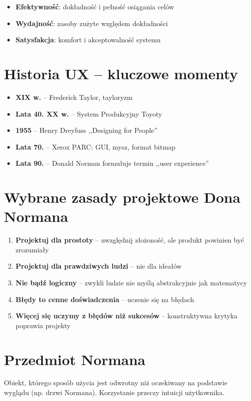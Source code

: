 \begin{itemize}
    \item \textbf{Efektywność}: dokładność i pełność osiągania celów
    \item \textbf{Wydajność}: zasoby zużyte względem dokładności
    \item \textbf{Satysfakcja}: komfort i akceptowalność systemu
\end{itemize}

\section{Historia UX -- kluczowe momenty}

\begin{itemize}
    \item \textbf{XIX w.} -- Frederick Taylor, tayloryzm
    \item \textbf{Lata 40. XX w.} -- System Produkcyjny Toyoty
    \item \textbf{1955} -- Henry Dreyfuss ,,Designing for People''
    \item \textbf{Lata 70.} -- Xerox PARC: GUI, mysz, format bitmap
    \item \textbf{Lata 90.} -- Donald Norman formułuje termin ,,user experience''
\end{itemize}

\section{Wybrane zasady projektowe Dona Normana}

\begin{enumerate}
    \item \textbf{Projektuj dla prostoty} -- uwzględnij złożoność, ale produkt powinien być zrozumiały
    \item \textbf{Projektuj dla prawdziwych ludzi} -- nie dla ideałów
    \item \textbf{Nie bądź logiczny} -- zwykli ludzie nie myślą abstrakcyjnie jak matematycy
    \item \textbf{Błędy to cenne doświadczenia} -- uczenie się na błędach
    \item \textbf{Więcej się uczymy z błędów niż sukcesów} -- konstruktywna krytyka poprawia projekty
\end{enumerate}

\section{Przedmiot Normana}

Obiekt, którego sposób użycia jest odwrotny niż oczekiwany na podstawie wyglądu (np. drzwi Normana). Korzystanie przeczy intuicji użytkownika.

